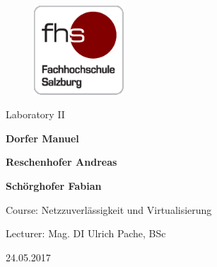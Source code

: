
\begin{titlepage}

\hspace{7cm}

\begin{figure}[!ht]
	\centering
	\includegraphics[width=0.3\textwidth]{fhs_logo_web.png}
\end{figure}

\begin{center}
	\vspace{2cm}
	\Huge Laboratory II
	\vspace{3cm}
	
	\Large{\bf\large Dorfer Manuel}	
	
	\Large{\bf\large Reschenhofer Andreas}
	
	\Large{\bf\large Schörghofer Fabian}
	\vspace{5cm}

	\large Course: Netzzuverlässigkeit und Virtualisierung 
	
	\large Lecturer: Mag. DI Ulrich Pache, BSc 
	
	\large 24.05.2017
\end{center}

\end{titlepage}